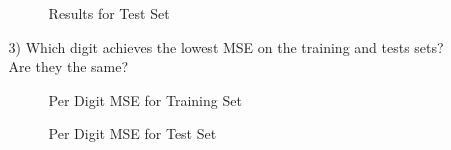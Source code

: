 \documentclass[fleqn]{article}
\begin{document}
\begin{enumerate}
\begin{enumerate}
			\begin{figure}[H]
				\centerline{}
				\caption{Results for Test Set}
				\label{test_results}
			\end{figure}
			
			\item[3)] Which digit achieves the lowest MSE on the training and tests sets? Are they the same?
			
			\begin{figure}[H]
				\centerline{}
				\caption{Per Digit MSE for Training Set}
				\label{mse_per_digit_training}
			\end{figure}
			
			\begin{figure}[H]
				\centerline{}
				\caption{Per Digit MSE for Test Set}
				\label{mse_per_digit_test}
			\end{figure}
			

\end{enumerate}
\end{enumerate}
\end{document}
